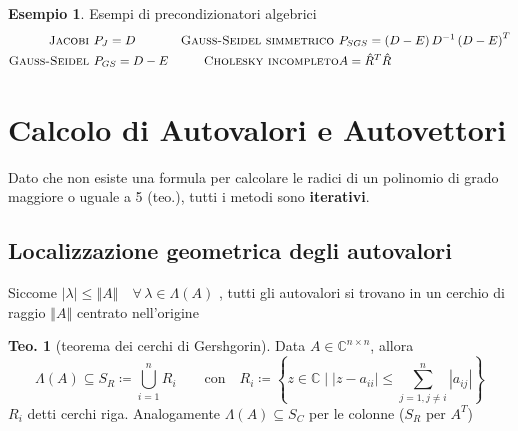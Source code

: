 \documentclass[a4paper,10pt]{article}
\theoremstyle{definition}
\theoremstyle{indentdefinition}
\theoremstyle{indenttheorem}
\newtheorem{thm}{Teo.}
\theoremstyle{myremark}
\newtheorem{example*}{Esempio}
\theoremstyle{indentgeneral}
\theoremstyle{plain}
\theoremstyle{plain}
\newenvironment{myboxed} 
{\noindent\begin{lrbox}{\mybox}\begin{minipage}{\textwidth}}
{\end{minipage}\end{lrbox}\fbox{\usebox{\mybox}}}
\begin{document}
\begin{example*}
Esempi di precondizionatori algebrici
\begin{align*}
\text{\textsc{Jacobi }} & P_{J}=D & \text{\textsc{Gauss-Seidel simmetrico }} & P_{SGS}=\left(D-E\right)D^{-1}\left(D-E\right)^{T}\\
\text{\textsc{Gauss-Seidel }} & P_{GS}=D-E & \text{\textsc{Cholesky incompleto}} & A=\hat{R}^{T}\hat{R}
\end{align*}
\end{example*}
\pagebreak{}

\section{Calcolo di Autovalori e Autovettori}
Dato che non esiste una formula per calcolare le radici di un polinomio di grado maggiore o uguale a 5 (teo.), tutti i metodi sono \textbf{iterativi}.

\subsection{Localizzazione geometrica degli autovalori}

Siccome $\left|\lambda\right|\leq\left\Vert A\right\Vert \quad\forall\,\lambda\in\Lambda\left(A\right)$
, tutti gli autovalori si trovano in un cerchio di raggio $\left\Vert A\right\Vert $
centrato nell'origine

\begin{myboxed}
\begin{thm}[teorema dei cerchi di Gershgorin]
Data $A\in\mathbb{C}^{n\times n}$, allora 
\[
\Lambda\left(A\right)\subseteq S_{R}\coloneqq\bigcup_{i=1}^{n}R_{i}\qquad\text{con}\quad R_{i}\coloneqq\left\{ z\in\mathbb{C}\mid\left|z-a_{ii}\right|\leq{\scriptstyle \sum_{j=1,j\neq i}^{n}}\left|a_{ij}\right|\right\} 
\]
$R_{i}$ detti cerchi riga. Analogamente $\Lambda\left(A\right)\subseteq S_{C}$
per le colonne ($S_{R}$ per $A^{T}$)
\end{thm}
\end{myboxed}
\end{document}
